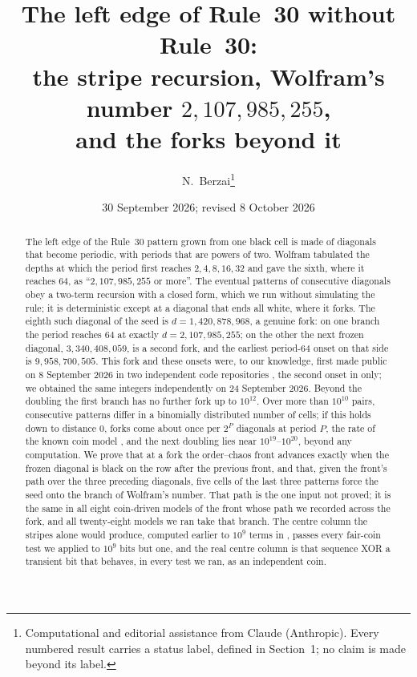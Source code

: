 \documentclass[11pt]{article}
\title{The left edge of Rule~30 without Rule~30:\\ the stripe recursion, Wolfram's number $2{,}107{,}985{,}255$,\\ and the forks beyond it}
\author{N.~Berzai\thanks{Computational and editorial assistance from Claude (Anthropic). Every numbered result carries a status label, defined in Section~1; no claim is made beyond its label.}}
\date{30 September 2026; revised 8 October 2026}
\theoremstyle{definition}
\theoremstyle{remark}
\begin{document}
\maketitle

\begin{abstract}
The left edge of the Rule~30 pattern grown from one black cell is made of diagonals that become periodic, with periods that are powers of two. Wolfram tabulated the depths at which the period first reaches $2,4,8,16,32$ and gave the sixth, where it reaches $64$, as ``$2{,}107{,}985{,}255$ or more''. The eventual patterns of consecutive diagonals obey a two-term recursion with a closed form, which we run without simulating the rule; it is deterministic except at a diagonal that ends all white, where it forks. The eighth such diagonal of the seed is $d=1{,}420{,}878{,}968$, a genuine fork: on one branch the period reaches $64$ at exactly $d=2{,}107{,}985{,}255$; on the other the next frozen diagonal, $3{,}340{,}408{,}059$, is a second fork, and the earliest period-$64$ onset on that side is $9{,}958{,}700{,}505$. This fork and these onsets were, to our knowledge, first made public on 8 September 2026 in two independent code repositories \cite{Dib,Pat}, the second onset in \cite{Pat} only; we obtained the same integers independently on 24 September 2026. Beyond the doubling the first branch has no further fork up to $10^{12}$. Over more than $10^{10}$ pairs, consecutive patterns differ in a binomially distributed number of cells; if this holds down to distance $0$, forks come about once per $2^P$ diagonals at period $P$, the rate of the known coin model \cite{Dib2,GG,Pat2}, and the next doubling lies near $10^{19}$--$10^{20}$, beyond any computation. We prove that at a fork the order--chaos front advances exactly when the frozen diagonal is black on the row after the previous front, and that, given the front's path over the three preceding diagonals, five cells of the last three patterns force the seed onto the branch of Wolfram's number. That path is the one input not proved; it is the same in all eight coin-driven models of the front whose path we recorded across the fork, and all twenty-eight models we ran take that branch. The centre column the stripes alone would produce, computed earlier to $10^9$ terms in \cite{Dib2}, passes every fair-coin test we applied to $10^9$ bits but one, and the real centre column is that sequence XOR a transient bit that behaves, in every test we ran, as an independent coin.
\end{abstract}
\end{document}
